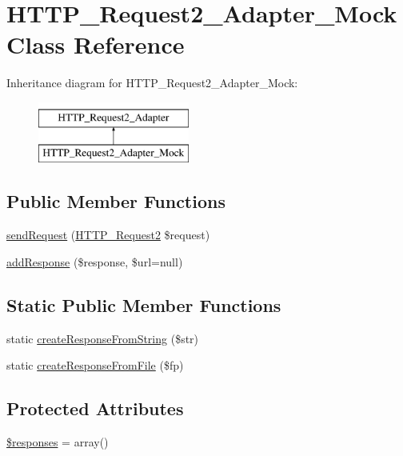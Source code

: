 \hypertarget{classHTTP__Request2__Adapter__Mock}{\section{H\-T\-T\-P\-\_\-\-Request2\-\_\-\-Adapter\-\_\-\-Mock Class Reference}
\label{classHTTP__Request2__Adapter__Mock}
}
Inheritance diagram for H\-T\-T\-P\-\_\-\-Request2\-\_\-\-Adapter\-\_\-\-Mock\-:\begin{figure}[H]
\begin{center}
\leavevmode
\includegraphics[height=2.000000cm]{classHTTP__Request2__Adapter__Mock}
\end{center}
\end{figure}
\subsection*{Public Member Functions}
\begin{DoxyCompactItemize}
\item 
\hyperlink{classHTTP__Request2__Adapter__Mock_ab85697c5438cc9b4c834ac6f15c46247}{send\-Request} (\hyperlink{classHTTP__Request2}{H\-T\-T\-P\-\_\-\-Request2} \$request)
\item 
\hyperlink{classHTTP__Request2__Adapter__Mock_a35bbf7a977f9711d4a965b220e11c291}{add\-Response} (\$response, \$url=null)
\end{DoxyCompactItemize}
\subsection*{Static Public Member Functions}
\begin{DoxyCompactItemize}
\item 
static \hyperlink{classHTTP__Request2__Adapter__Mock_a0732ba355bbab5c382378be5169084f0}{create\-Response\-From\-String} (\$str)
\item 
static \hyperlink{classHTTP__Request2__Adapter__Mock_ae767247efbe46fa5f1d5bf4363c2eb52}{create\-Response\-From\-File} (\$fp)
\end{DoxyCompactItemize}
\subsection*{Protected Attributes}
\begin{DoxyCompactItemize}
\item 
\hyperlink{classHTTP__Request2__Adapter__Mock_a2717aa3ac157e464e3c71892bb4dd1a1}{\$responses} = array()
\end{DoxyCompactItemize}

